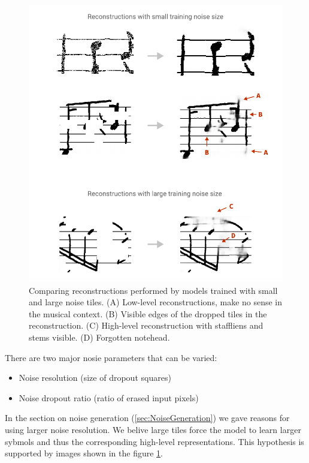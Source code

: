 \begin{figure}[p]
    \centering
    \includegraphics[width=140mm]{../../figures/06-noise/noise-size.pdf}
    \caption{Comparing reconstructions performed by models trained with small and large noise tiles. (A) Low-level reconstructions, make no sense in the musical context. (B) Visible edges of the dropped tiles in the reconstruction. (C) High-level reconstruction with staffliens and stems visible. (D) Forgotten notehead.}
    \label{fig:NoiseSize}
\end{figure}

There are two major nosie parameters that can be varied:

\begin{itemize}
    \item Noise resolution (size of dropout squares)
    \item Noise dropout ratio (ratio of erased input pixels)
\end{itemize}

In the section on noise generation (\ref{sec:NoiseGeneration}) we gave reasons for using larger noise resolution. We belive large tiles force the model to learn larger sybmols and thus the corresponding high-level representations. This hypothesis is supported by images shown in the figure \ref{fig:NoiseSize}.

